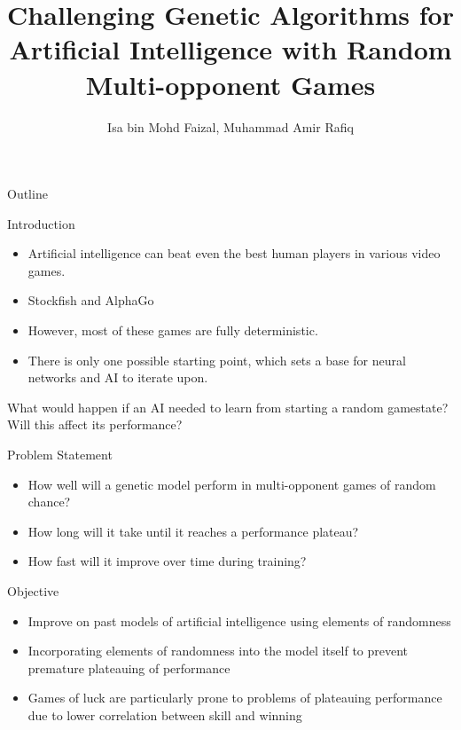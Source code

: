 \documentclass{beamer}
\title{Challenging Genetic Algorithms for Artificial Intelligence with Random Multi-opponent Games}
\author{Isa bin Mohd Faizal, Muhammad Amir Rafiq}
\institute{Universiti Kebangsaan Malaysia}
\begin{document}
	
	
\begin{frame}[plain]
    \maketitle
\end{frame}

\begin{frame}{Outline}

	\tableofcontents
	
\end{frame}

\begin{frame}{Introduction}
	
	\begin{itemize}
		\item  Artificial intelligence can beat even the best human players in various video games.
		\item Stockfish and AlphaGo
		\item However, most of these games are fully deterministic.
		\item There is only one possible starting point, which sets a base for neural networks and AI to iterate upon.
	\end{itemize}
	What would happen if an AI needed to learn from starting a random gamestate? Will this affect its performance?
	
\end{frame}

\begin{frame}{Problem Statement}

	\begin{itemize}
		
		\item How well will a genetic model perform in multi-opponent games of random chance?
		\item How long will it take until it reaches a performance plateau?
		\item How fast will it improve over time during training?
		
		
	\end{itemize}

\end{frame}

\begin{frame}{Objective}
	
	\begin{itemize}
		
		\item Improve on past models of artificial intelligence using elements of randomness
		\item Incorporating elements of randomness into the model itself to prevent premature plateauing of performance
		\item Games of luck are particularly prone to problems of plateauing performance due to lower correlation between skill and winning

	\end{itemize}
	
\end{frame}
\end{document}
